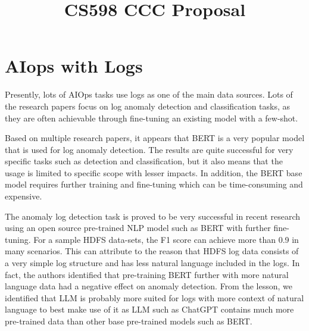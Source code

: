 \documentclass[conference]{IEEEtran}
\begin{document}
\title{CS598 CCC Proposal\\
}

\author{
\and
{}
\and
{}
}
\maketitle

\section{AIops with Logs}
Presently, lots of AIOps tasks use logs as one of the main data sources. Lots of the research papers focus on log anomaly detection and classification tasks, as they are often achievable through fine-tuning an existing model with a few-shot. 

Based on multiple research papers, it appears that BERT is a very popular model that is used for log anomaly detection. The results are quite successful for very specific tasks such as detection and classification, but it also means that the usage is limited to specific scope with lesser impacts. In addition, the BERT base model requires further training and fine-tuning which can be time-consuming and expensive. \cite{Souce https://www.sciencedirect.com/science/article/pii/S156849462300707X}

The anomaly log detection task is proved to be very successful in recent research using an open source pre-trained NLP model such as BERT with further fine-tuning. For a sample HDFS data-sets, the F1 score can achieve more than 0.9 in many scenarios. This can attribute to the reason that HDFS log data consists of a very simple log structure and has less natural language included in the logs. In fact, the authors identified that pre-training BERT further with more natural language data had a negative effect on anomaly detection. \cite{Souce https://www.sciencedirect.com/science/article/pii/S156849462300707X} From the lesson, we identified that LLM is probably more suited for logs with more context of natural language to best make use of it as LLM such as ChatGPT contains much more pre-trained data than other base pre-trained models such as BERT.
\end{document}
